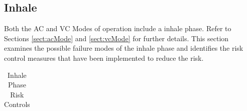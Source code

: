 \documentclass[]{article}
\begin{document}
\subsection{Inhale}

Both the AC and VC Modes of operation include a inhale phase.  Refer to Sections \ref{sect:acMode} and \ref{sect:vcMode} for further details. This section examines the possible failure modes of the inhale phase and identifies the risk control measures that have been implemented to reduce the risk.

\begin{center}
	\begin{table}[h]
		\caption{Inhale Phase Risk Controls}
		\label{tab:inhale_risk}
		\begin{tabular}{ |p{3.5cm}|p{3cm}| p{3.5cm}| p{3.5cm}|}
			

\end{tabular}
\end{table}
\end{center}
\end{document}
